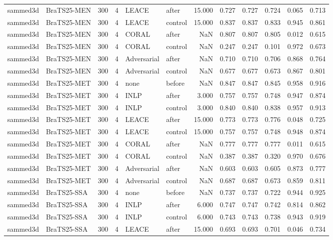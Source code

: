 \begin{tabular}{llrrllrrrrrr}
sammed3d & BraTS25-MEN & 300 & 4 & LEACE & after & 15.000 & 0.727 & 0.727 & 0.724 & 0.065 & 0.713 \\
sammed3d & BraTS25-MEN & 300 & 4 & LEACE & control & 15.000 & 0.837 & 0.837 & 0.833 & 0.945 & 0.861 \\
sammed3d & BraTS25-MEN & 300 & 4 & CORAL & after & NaN & 0.807 & 0.807 & 0.805 & 0.012 & 0.615 \\
sammed3d & BraTS25-MEN & 300 & 4 & CORAL & control & NaN & 0.247 & 0.247 & 0.101 & 0.972 & 0.673 \\
sammed3d & BraTS25-MEN & 300 & 4 & Adversarial & after & NaN & 0.710 & 0.710 & 0.706 & 0.868 & 0.764 \\
sammed3d & BraTS25-MEN & 300 & 4 & Adversarial & control & NaN & 0.677 & 0.677 & 0.673 & 0.867 & 0.801 \\
sammed3d & BraTS25-MET & 300 & 4 & none & before & NaN & 0.847 & 0.847 & 0.845 & 0.958 & 0.916 \\
sammed3d & BraTS25-MET & 300 & 4 & INLP & after & 3.000 & 0.757 & 0.757 & 0.748 & 0.947 & 0.874 \\
sammed3d & BraTS25-MET & 300 & 4 & INLP & control & 3.000 & 0.840 & 0.840 & 0.838 & 0.957 & 0.913 \\
sammed3d & BraTS25-MET & 300 & 4 & LEACE & after & 15.000 & 0.773 & 0.773 & 0.776 & 0.048 & 0.725 \\
sammed3d & BraTS25-MET & 300 & 4 & LEACE & control & 15.000 & 0.757 & 0.757 & 0.748 & 0.948 & 0.874 \\
sammed3d & BraTS25-MET & 300 & 4 & CORAL & after & NaN & 0.777 & 0.777 & 0.777 & 0.011 & 0.615 \\
sammed3d & BraTS25-MET & 300 & 4 & CORAL & control & NaN & 0.387 & 0.387 & 0.320 & 0.970 & 0.676 \\
sammed3d & BraTS25-MET & 300 & 4 & Adversarial & after & NaN & 0.603 & 0.603 & 0.605 & 0.873 & 0.777 \\
sammed3d & BraTS25-MET & 300 & 4 & Adversarial & control & NaN & 0.687 & 0.687 & 0.673 & 0.859 & 0.811 \\
sammed3d & BraTS25-SSA & 300 & 4 & none & before & NaN & 0.737 & 0.737 & 0.722 & 0.944 & 0.925 \\
sammed3d & BraTS25-SSA & 300 & 4 & INLP & after & 6.000 & 0.747 & 0.747 & 0.742 & 0.814 & 0.862 \\
sammed3d & BraTS25-SSA & 300 & 4 & INLP & control & 6.000 & 0.743 & 0.743 & 0.738 & 0.943 & 0.919 \\
sammed3d & BraTS25-SSA & 300 & 4 & LEACE & after & 15.000 & 0.693 & 0.693 & 0.701 & 0.046 & 0.734 \\

\end{tabular}

